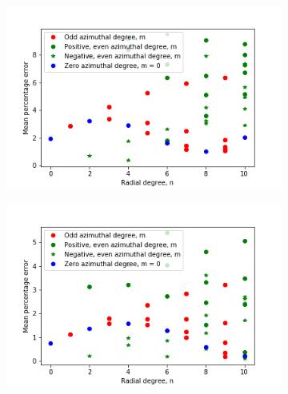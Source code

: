 \begin{figure}[h]
	\centering
	\begin{subfigure}{0.48\textwidth}
		\centering
		\includegraphics[width=\linewidth]{images/Zernike_fitting_percentage_error_one_mode_32_shape_radial_azimuthal_pos_neg.png}
		\caption{}
		\label{fig:Zernike_fitting_percentage_error_one_mode_32_shape}
	\end{subfigure}
	\begin{subfigure}{0.48\textwidth}
		\centering
		\includegraphics[width=\linewidth]{images/Zernike_fitting_percentage_error_one_mode_64_shape_radial_azimuthal_pos_neg.png}
		\caption{}
		\label{fig:Zernike_fitting_percentage_error_one_mode_64_shape}
	\end{subfigure}
	

\end{figure}
